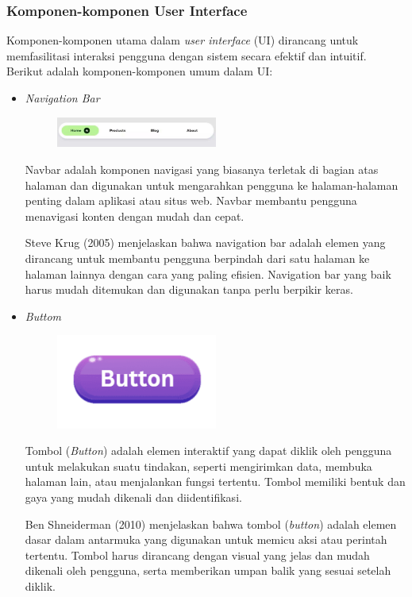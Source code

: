 \documentclass[12pt]{article}
\begin{document}
\subsubsection{Komponen-komponen User Interface}
Komponen-komponen utama dalam \emph{user interface} (UI) dirancang untuk memfasilitasi interaksi pengguna dengan sistem secara efektif dan intuitif. Berikut adalah komponen-komponen umum dalam UI:
\begin{itemize}
\item \emph{Navigation Bar}
\begin{figure}[h] %
    \centering
    \includegraphics[width=0.5\textwidth]{asset/navbar.png }
\end{figure}
\par Navbar adalah komponen navigasi yang biasanya terletak di bagian atas halaman dan digunakan untuk mengarahkan pengguna ke halaman-halaman penting dalam aplikasi atau situs web. Navbar membantu pengguna menavigasi konten dengan mudah dan cepat.
\par Steve Krug  (2005) menjelaskan bahwa navigation bar adalah elemen yang dirancang untuk membantu pengguna berpindah dari satu halaman ke halaman lainnya dengan cara yang paling efisien. Navigation bar yang baik harus mudah ditemukan dan digunakan tanpa perlu berpikir keras.

\item \emph{Buttom}
\begin{figure}[h] %
    \centering
    \includegraphics[width=0.5\textwidth]{asset/button.png }
\end{figure}
\par Tombol (\emph{Button}) adalah elemen interaktif yang dapat diklik oleh pengguna untuk melakukan suatu tindakan, seperti mengirimkan data, membuka halaman lain, atau menjalankan fungsi tertentu. Tombol memiliki bentuk dan gaya yang mudah dikenali dan diidentifikasi.
\par Ben Shneiderman (2010) menjelaskan bahwa tombol (\emph{button}) adalah elemen dasar dalam antarmuka yang digunakan untuk memicu aksi atau perintah tertentu. Tombol harus dirancang dengan visual yang jelas dan mudah dikenali oleh pengguna, serta memberikan umpan balik yang sesuai setelah diklik.


\end{itemize}
\end{document}
